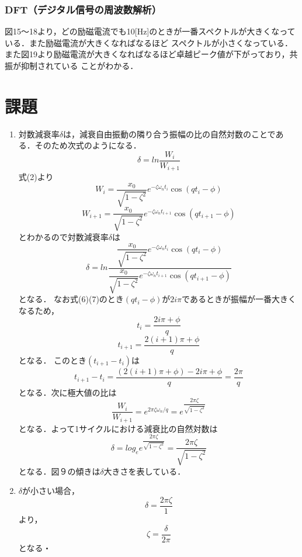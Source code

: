 \documentclass[a4paper,10.5pt]{jsarticle}
\begin{document}
\subsubsection{DFT（デジタル信号の周波数解析）}
図15〜18より，どの励磁電流でも10[Hz]のときが一番スペクトルが大きくなっている．また励磁電流が大きくなればなるほど
スペクトルが小さくなっている．また図19より励磁電流が大きくなればなるほど卓越ピーク値が下がっており，共振が抑制されている
ことがわかる．
\section{課題}
\begin{enumerate}
  \item 
対数減衰率$\delta$は，減衰自由振動の隣り合う振幅の比の自然対数のことである．そのため次式のようになる．
\begin{equation}
  \delta = {ln\dfrac{W_i}{W_{i+1}}}
\end{equation}
式(2)より
\begin{equation}
  W_i = {\dfrac{x_0}{\sqrt{1-\zeta^2}}e^{-\zeta {\omega}_{n} t_i}\cos (qt_i-\phi)}
\end{equation}
\begin{equation}
  W_{i+1} = {\dfrac{x_0}{\sqrt{1-\zeta^2}}e^{-\zeta {\omega}_{n} t_{i+1}}\cos (qt_{i+1}-\phi)}
\end{equation}
とわかるので対数減衰率$\delta$は
\begin{equation}
  \delta = ln{\dfrac{\dfrac{x_0}{\sqrt{1-\zeta^2}}e^{-\zeta {\omega}_{n} t_i}\cos (qt_i-\phi)}{\dfrac{x_0}{\sqrt{1-\zeta^2}}e^{-\zeta {\omega}_{n} t_{i+1}}\cos (qt_{i+1}-\phi)}}
\end{equation}
となる．
なお式(6)(7)のとき$(qt_{i}-\phi)$が$2i\pi$であるときが振幅が一番大きくなるため，
\begin{equation}
  t_i = {\dfrac{2i\pi+\phi}{q}}
\end{equation}
\begin{equation}
  t_{i+1} = {\dfrac{2(i+1)\pi+\phi}{q}}
\end{equation}
となる．
このとき$(t_{i+1}-t_{i})$は
\begin{equation}
  t_{i+1}-t_{i} = {\dfrac{(2(i+1)\pi+\phi)-2i\pi+\phi}{q}} = {\dfrac{2\pi}{q}}
\end{equation}
となる．次に極大値の比は
\begin{equation}
  {\dfrac{W_i}{W_{i+1}}} = e^{{2\pi\zeta\omega_n}/q} = e^{\dfrac{2\pi\zeta}{\sqrt{1-\zeta^2}}}
\end{equation}
となる．よって1サイクルにおける減衰比の自然対数は
\begin{equation}
  \delta = log_e{e^{\dfrac{2\pi\zeta}{\sqrt{1-\zeta^2}}}} = {\dfrac{2\pi\zeta}{\sqrt{1-\zeta^2}}}
\end{equation}
となる．図９の傾きは$\delta$大きさを表している．
  \item $\delta$が小さい場合，
  \begin{equation}
    \delta = {\dfrac{2\pi\zeta}{{1}}}
  \end{equation}
  より，
  \begin{equation}
    \zeta = {\dfrac{\delta}{{2\pi}}}
  \end{equation}
  となる・


\end{enumerate}
\end{document}
